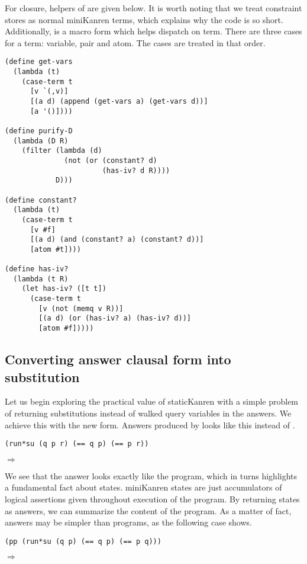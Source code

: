For closure, helpers of  are given below. It is worth noting that we treat constraint stores as normal miniKanren terms, which explains why the code is so short. Additionally,  is a macro form which helps dispatch on term. There are three cases for a term: variable, pair and atom. The cases are treated in that order.
\begin{lstlisting}
(define get-vars
  (lambda (t)
    (case-term t
      [v `(,v)]
      [(a d) (append (get-vars a) (get-vars d))]
      [a '()])))

(define purify-D
  (lambda (D R)
    (filter (lambda (d)
              (not (or (constant? d)
                       (has-iv? d R))))
            D)))

(define constant?
  (lambda (t)
    (case-term t
      [v #f]
      [(a d) (and (constant? a) (constant? d))]
      [atom #t])))

(define has-iv?
  (lambda (t R)
    (let has-iv? ([t t])
      (case-term t
        [v (not (memq v R))]
        [(a d) (or (has-iv? a) (has-iv? d))]
        [atom #f]))))
\end{lstlisting}

\subsection{Converting answer clausal form into  substitution}\label{S}
Let us begin exploring the practical value of staticKanren with a simple problem of returning substitutions instead of walked query variables in the answers. We achieve this with the new  form. Answers produced by  looks like this instead of .
\begin{lstlisting}
(run*su (q p r) (== q p) (== p r))
\end{lstlisting}
$\Rightarrow$ 

We see that the answer looks exactly like the program, which in turns highlights a fundamental fact about states. miniKanren states are just accumulators of logical assertions given throughout execution of the program. By returning states as answers, we can summarize the content of the program. As a matter of fact, answers may be simpler than programs, as the following case shows.
\begin{lstlisting}
(pp (run*su (q p) (== q p) (== p q)))
\end{lstlisting}
$\Rightarrow$ 

